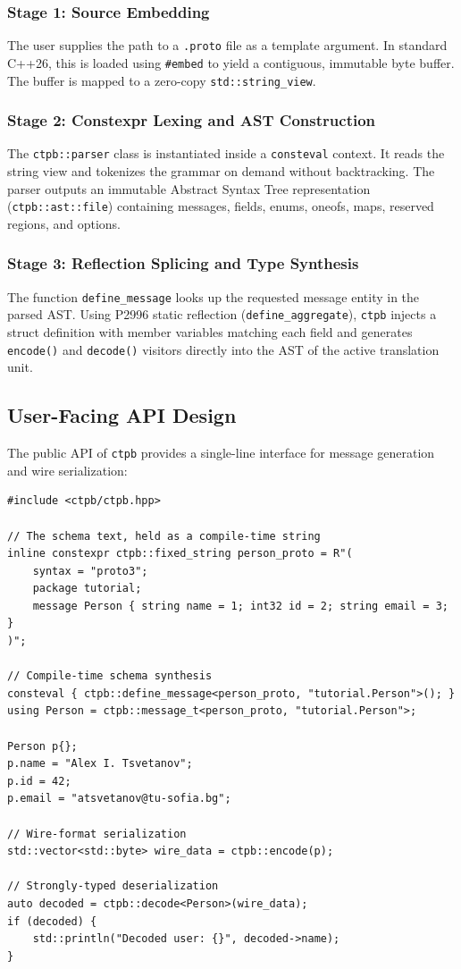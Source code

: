 \subsubsection{Stage 1: Source Embedding}
The user supplies the path to a \texttt{.proto} file as a template argument. In standard C++26, this is loaded using \texttt{\#embed} to yield a contiguous, immutable byte buffer. The buffer is mapped to a zero-copy \texttt{std::string\_view}.

\subsubsection{Stage 2: Constexpr Lexing and AST Construction}
The \texttt{ctpb::parser} class is instantiated inside a \texttt{consteval} context. It reads the string view and tokenizes the grammar on demand without backtracking. The parser outputs an immutable Abstract Syntax Tree representation (\texttt{ctpb::ast::file}) containing messages, fields, enums, oneofs, maps, reserved regions, and options.

\subsubsection{Stage 3: Reflection Splicing and Type Synthesis}
The function \texttt{define\_message} looks up the requested message entity in the parsed AST. Using P2996 static reflection (\texttt{define\_aggregate}), \texttt{ctpb} injects a struct definition with member variables matching each field and generates \texttt{encode()} and \texttt{decode()} visitors directly into the AST of the active translation unit.

\subsection{User-Facing API Design}
The public API of \texttt{ctpb} provides a single-line interface for message generation and wire serialization:

\begin{lstlisting}[language=ModernC++, caption={User API in \texttt{ctpb}}]
#include <ctpb/ctpb.hpp>

// The schema text, held as a compile-time string
inline constexpr ctpb::fixed_string person_proto = R"(
    syntax = "proto3";
    package tutorial;
    message Person { string name = 1; int32 id = 2; string email = 3; }
)";

// Compile-time schema synthesis
consteval { ctpb::define_message<person_proto, "tutorial.Person">(); }
using Person = ctpb::message_t<person_proto, "tutorial.Person">;

Person p{};
p.name = "Alex I. Tsvetanov";
p.id = 42;
p.email = "atsvetanov@tu-sofia.bg";

// Wire-format serialization
std::vector<std::byte> wire_data = ctpb::encode(p);

// Strongly-typed deserialization
auto decoded = ctpb::decode<Person>(wire_data);
if (decoded) {
    std::println("Decoded user: {}", decoded->name);
}
\end{lstlisting}

